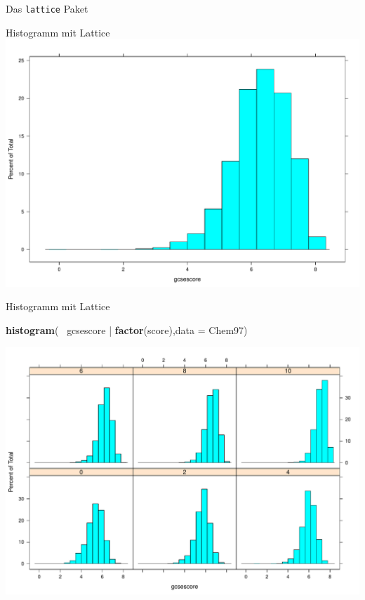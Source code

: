 \documentclass[ignorenonframetext,]{beamer}
\newenvironment{Shaded}{}{}
\newcommand{\KeywordTok}[1]{\textcolor[rgb]{0.00,0.44,0.13}{\textbf{{#1}}}}
\newcommand{\DataTypeTok}[1]{\textcolor[rgb]{0.56,0.13,0.00}{{#1}}}
\newcommand{\StringTok}[1]{\textcolor[rgb]{0.25,0.44,0.63}{{#1}}}
\newcommand{\NormalTok}[1]{{#1}}
\begin{document}
\begin{frame}[fragile]{Das \texttt{lattice} Paket}
\begin{block}{Histogramm mit Lattice}
\includegraphics{R_intern_files/figure-beamer/unnamed-chunk-220-1.pdf}

\end{block}

\begin{block}{Histogramm mit Lattice}

\begin{Shaded}
\begin{Highlighting}[]
  \KeywordTok{histogram}\NormalTok{(~}\StringTok{ }\NormalTok{gcsescore |}\StringTok{ }\KeywordTok{factor}\NormalTok{(score),}\DataTypeTok{data =} \NormalTok{Chem97)}
\end{Highlighting}
\end{Shaded}

\includegraphics{R_intern_files/figure-beamer/unnamed-chunk-221-1.pdf}


\end{block}
\end{frame}
\end{document}

